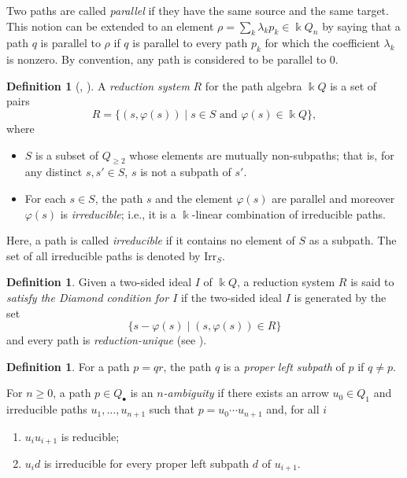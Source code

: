 \documentclass[a4paper, reqno, 11pt]{amsart}
\theoremstyle{definition}
\newtheorem{definition}[theorem]{Definition}
\newcommand{\Irr}{\mathrm{Irr}}
\begin{document}
	
	
	Two paths are called \textit{parallel} if they have the same source and the same target. This notion can be extended to an element $\rho=\sum\limits_{k} \lambda_k p_k \in \Bbbk Q_n$ by saying that a path $q$ is parallel to $\rho$ if $q$ is parallel to every path $p_k$ for which the coefficient $\lambda_k$ is nonzero. By convention, any path is considered to be parallel to 0.
	
	
	\begin{definition}
		[{\cite[§1]{Bergman1978}, \cite[Definition 3.1]{Barmeier-Wang2020}}]\label{def reduction system}
		A \textit{reduction system} $R$ for the path algebra $\Bbbk Q$ is a set of pairs
		\[
		R = \{ (s, \varphi(s)) \mid s \in S \text{ and } \varphi(s) \in \Bbbk Q \},
		\]
		where
		\begin{itemize}[label=--]
			\item $S$ is a subset of $Q_{\geq 2}$ whose elements are mutually non-subpaths; that is, for any distinct $s, s' \in S$, $s$ is not a subpath of $s'$.
			\item For each $s \in S$, the path $s$ and the element $\varphi(s)$ are parallel and moreover $\varphi(s)$ is \textit{irreducible}; i.e., it is a $\Bbbk$-linear combination of irreducible paths.
		\end{itemize}
		Here, a path is called \textit{irreducible} if it contains no element of $S$ as a subpath. The set of all irreducible paths is denoted by $\Irr_S$.
	\end{definition}
	
	\begin{definition}
		Given a two-sided ideal $I$ of $\Bbbk Q$, a reduction system $R$ is said to \textit{satisfy the Diamond condition for $I$} if  the two-sided ideal $I$ is generated by the set $$\{ s - \varphi(s) \mid (s, \varphi(s)) \in R \}$$ and  every path is \textit{reduction-unique} (see \cite[Definition 3.2]{Barmeier-Wang2020}).
	\end{definition}
	
	\begin{definition}
		For a path $p = qr$, the path $q$ is a \textit{proper left subpath} of $p$ if $q \neq p$.
		
		For $n \geq 0$, a path $p \in Q_\bullet$ is an \textit{$n$-ambiguity} if there exists an arrow $u_0 \in Q_1$ and irreducible paths $u_1, \dotsc, u_{n+1}$ such that $p = u_0 \dotsb u_{n+1}$ and, for all $i$
		\begin{enumerate}
			\item $u_i u_{i+1}$ is reducible;
			\item $u_i d$ is irreducible for every proper left subpath $d$ of $u_{i+1}$.
		\end{enumerate}
	\end{definition}
	
\end{document}
